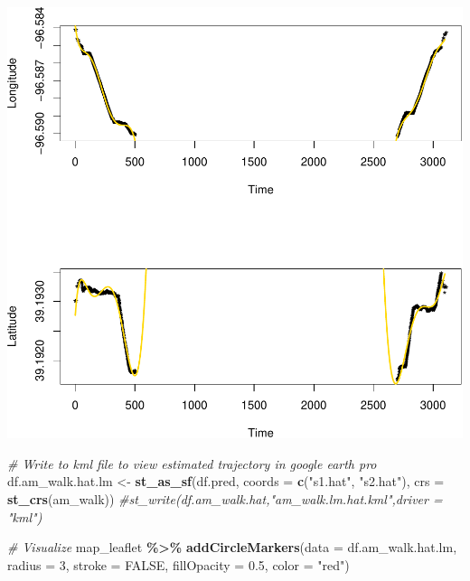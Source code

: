 \documentclass[
]{book}
\newenvironment{Shaded}{\begin{snugshade}}{\end{snugshade}}
\newcommand{\AttributeTok}[1]{\textcolor[rgb]{0.13,0.29,0.53}{#1}}
\newcommand{\CommentTok}[1]{\textcolor[rgb]{0.56,0.35,0.01}{\textit{#1}}}
\newcommand{\ConstantTok}[1]{\textcolor[rgb]{0.56,0.35,0.01}{#1}}
\newcommand{\DecValTok}[1]{\textcolor[rgb]{0.00,0.00,0.81}{#1}}
\newcommand{\FloatTok}[1]{\textcolor[rgb]{0.00,0.00,0.81}{#1}}
\newcommand{\FunctionTok}[1]{\textcolor[rgb]{0.13,0.29,0.53}{\textbf{#1}}}
\newcommand{\NormalTok}[1]{#1}
\newcommand{\OtherTok}[1]{\textcolor[rgb]{0.56,0.35,0.01}{#1}}
\newcommand{\SpecialCharTok}[1]{\textcolor[rgb]{0.81,0.36,0.00}{\textbf{#1}}}
\newcommand{\StringTok}[1]{\textcolor[rgb]{0.31,0.60,0.02}{#1}}
\begin{document}
\includegraphics{_main_files/figure-latex/unnamed-chunk-7-1.pdf}

\begin{Shaded}
\begin{Highlighting}[]
\CommentTok{\# Write to kml file to view estimated trajectory in google earth pro}
\NormalTok{df.am\_walk.hat.lm }\OtherTok{\textless{}{-}} \FunctionTok{st\_as\_sf}\NormalTok{(df.pred, }\AttributeTok{coords =} \FunctionTok{c}\NormalTok{(}\StringTok{"s1.hat"}\NormalTok{, }\StringTok{"s2.hat"}\NormalTok{), }
                           \AttributeTok{crs =} \FunctionTok{st\_crs}\NormalTok{(am\_walk))}
\CommentTok{\#st\_write(df.am\_walk.hat,"am\_walk.lm.hat.kml",driver = "kml")}

\CommentTok{\# Visualize}
\NormalTok{map\_leaflet }\SpecialCharTok{\%\textgreater{}\%}
  \FunctionTok{addCircleMarkers}\NormalTok{(}\AttributeTok{data =}\NormalTok{ df.am\_walk.hat.lm,}
                   \AttributeTok{radius =} \DecValTok{3}\NormalTok{, }\AttributeTok{stroke =} \ConstantTok{FALSE}\NormalTok{, }\AttributeTok{fillOpacity =} \FloatTok{0.5}\NormalTok{,}
                   \AttributeTok{color =} \StringTok{"red"}\NormalTok{)}
\end{Highlighting}
\end{Shaded}
\end{document}
